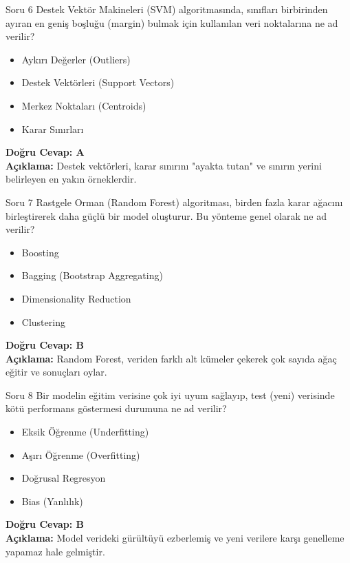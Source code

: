 \documentclass[12pt,a4paper]{article}
\begin{document}
\begin{testcard}{Soru 6}
    Destek Vektör Makineleri (SVM) algoritmasında, sınıfları birbirinden ayıran en geniş boşluğu (margin) bulmak için kullanılan veri noktalarına ne ad verilir?
    \begin{itemize}
        \item[A)] Aykırı Değerler (Outliers)
        \item[B)] Destek Vektörleri (Support Vectors)
        \item[C)] Merkez Noktaları (Centroids)
        \item[D)] Karar Sınırları
    \end{itemize}
    \tcblower
    \textbf{Doğru Cevap: A} \\
    \textbf{Açıklama:} Destek vektörleri, karar sınırını "ayakta tutan" ve sınırın yerini belirleyen en yakın örneklerdir.
\end{testcard}

\begin{testcard}{Soru 7}
    Rastgele Orman (Random Forest) algoritması, birden fazla karar ağacını birleştirerek daha güçlü bir model oluşturur. Bu yönteme genel olarak ne ad verilir?
    \begin{itemize}
        \item[A)] Boosting
        \item[B)] Bagging (Bootstrap Aggregating)
        \item[C)] Dimensionality Reduction
        \item[D)] Clustering
    \end{itemize}
    \tcblower
    \textbf{Doğru Cevap: B} \\
    \textbf{Açıklama:} Random Forest, veriden farklı alt kümeler çekerek çok sayıda ağaç eğitir ve sonuçları oylar.
\end{testcard}

\begin{testcard}{Soru 8}
    Bir modelin eğitim verisine çok iyi uyum sağlayıp, test (yeni) verisinde kötü performans göstermesi durumuna ne ad verilir?
    \begin{itemize}
        \item[A)] Eksik Öğrenme (Underfitting)
        \item[B)] Aşırı Öğrenme (Overfitting)
        \item[C)] Doğrusal Regresyon
        \item[D)] Bias (Yanlılık)
    \end{itemize}
    \tcblower
    \textbf{Doğru Cevap: B} \\
    \textbf{Açıklama:} Model verideki gürültüyü ezberlemiş ve yeni verilere karşı genelleme yapamaz hale gelmiştir.
\end{testcard}
\end{document}
